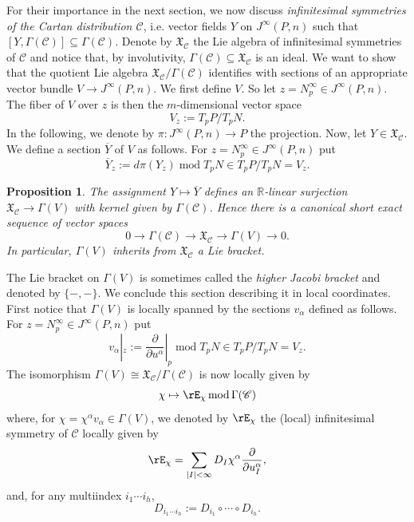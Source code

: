 \documentclass{conm-p-l}
\newtheorem{proposition}[theorem]{Proposition}
\theoremstyle{definition}
\theoremstyle{remark}
\numberwithin{equation}{section}
\begin{document}
For their importance in the next section, we now discuss \emph{infinitesimal symmetries of the Cartan distribution $\mathscr C$}, i.e.{} vector fields $Y$ on $J^\infty (P, n)$ such that $[Y, \Gamma (\mathscr C)] \subseteq \Gamma (\mathscr C)$. Denote by $\mathfrak X_{\mathscr C}$ the Lie algebra of infinitesimal symmetries of $\mathscr C$ and notice that, by involutivity, $\Gamma (\mathscr C) \subseteq \mathfrak X_{\mathscr C}$ is an ideal. We want to show that the quotient Lie algebra $\mathfrak X_{\mathscr C} / \Gamma (\mathscr C)$ identifies with sections of an appropriate vector bundle $V \to J^\infty (P, n)$. We first define $V$. So let $z = N^\infty_p \in J^\infty (P, n)$. The fiber of $V$ over $z$ is then the $m$-dimensional vector space
\[
V_z := T_p P / T_p N.
\]
In the following, we denote by $\pi : J^\infty (P, n) \to P$ the projection. Now, let $Y \in \mathfrak X_{\mathscr C}$. We define a section $\overline Y$ of $V$ as follows. For $z = N^\infty_p \in J^\infty (P, n)$ put
\[
\overline Y_z := d\pi (Y_z) \operatorname{mod} T_p N \in T_p P / T_p N = V_z.
\]

\begin{proposition}
The assignment $Y \mapsto \overline Y$ defines an $\mathbb R$-linear surjection $\mathfrak X_{\mathscr{C}} \to \Gamma (V)$ with kernel given by $\Gamma (\mathscr C)$. Hence there is a canonical short exact sequence of vector spaces
\[
0 \longrightarrow \Gamma (\mathscr C) \longrightarrow \mathfrak X_{\mathscr C} \longrightarrow \Gamma (V) \longrightarrow 0.
\]
In particular, $\Gamma (V)$ inherits from $\mathfrak X_{\mathscr C}$ a Lie bracket.
\end{proposition}


The Lie bracket on $\Gamma (V)$ is sometimes called the \emph{higher Jacobi bracket} and denoted by $\{-,-\}$. We conclude this section describing it in local coordinates. First notice that $\Gamma (V)$ is locally spanned by the sections $v_\alpha$ defined as follows. For $z = N^\infty_p \in J^\infty (P, n)$ put
\[
v_\alpha |_z := \frac{\partial}{\partial u^\alpha}|_p \operatorname{mod} T_p N \in T_p P / T_p N = V_z.
\]
The isomorphism $\Gamma (V) \cong \mathfrak X_{\mathscr{C}} / \Gamma (\mathscr C)$ is now locally given by
\[
\chi \mapsto \rE_\chi \operatorname{mod} \Gamma (\mathscr C)
\]
where, for $\chi = \chi^\alpha v_\alpha \in \Gamma (V)$, we denoted by $\rE_\chi$ the (local) infinitesimal symmetry of $\mathscr C$ locally given by
\begin{equation}\label{eq:ev_vf}
\rE_\chi = \sum_{|I| < \infty} D_I \chi^\alpha \frac{\partial}{\partial u^\alpha_I},
\end{equation}
and, for any multiindex $i_1\cdots i_h$,
\[
D_{i_1 \cdots i_h} := D_{i_1} \circ \cdots \circ D_{i_h}.
\]
 
\end{document}
